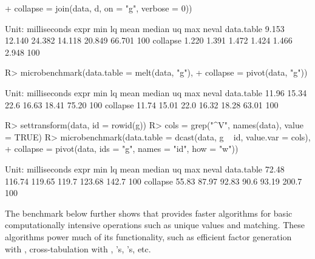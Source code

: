 \documentclass[nojss]{jss} %
\newcommand{\fct}[1]{\code{#1()}}
\begin{document}
\begin{Schunk}
\begin{Sinput}
+                 collapse = join(data, d, on = "g", verbose = 0))
\end{Sinput}
\begin{Soutput}
Unit: milliseconds
       expr   min     lq   mean median     uq    max neval
 data.table 9.153 12.140 24.382 14.118 20.849 66.701   100
   collapse 1.220  1.391  1.472  1.424  1.466  2.948   100
\end{Soutput}
\begin{Sinput}
R> microbenchmark(data.table = melt(data, "g"),
+                 collapse = pivot(data, "g"))
\end{Sinput}
\begin{Soutput}
Unit: milliseconds
       expr   min    lq mean median    uq   max neval
 data.table 11.96 15.34 22.6  16.63 18.41 75.20   100
   collapse 11.74 15.01 22.0  16.32 18.28 63.01   100
\end{Soutput}
\begin{Sinput}
R> settransform(data, id = rowid(g))
R> cols = grep("^V", names(data), value = TRUE)
R> microbenchmark(data.table = dcast(data, g ~ id, value.var = cols),
+            collapse = pivot(data, ids = "g", names = "id", how = "w"))
\end{Sinput}
\begin{Soutput}
Unit: milliseconds
       expr   min     lq   mean median     uq   max neval
 data.table 72.48 116.74 119.65  119.7 123.68 142.7   100
   collapse 55.83  87.97  92.83   90.6  93.19 200.7   100
\end{Soutput}
\end{Schunk}
%
The benchmark below further shows that  provides faster algorithms for basic computationally intensive operations such as unique values and matching. These algorithms power much of its functionality, such as efficient factor generation with \fct{qF}, cross-tabulation with \fct{qtab}, \fct{join}'s, \fct{pivot}'s, etc.
%
\end{document}
